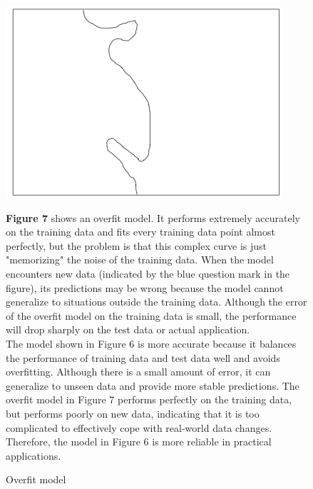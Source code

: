 \documentclass[12pt,a4paper]{article}
\begin{document}
\begin{figure}[h]
    \centering
    \includegraphics[width=0.5\linewidth]{Overfit model.png}
    \caption{  Overfit model}
    \label{fig:enter-label}
    \vspace{1em}
    \textbf{Figure 7} shows an overfit model. It performs extremely accurately on the training data and fits every training data point almost perfectly, but the problem is that this complex curve is just "memorizing" the noise of the training data. When the model encounters new data (indicated by the blue question mark in the figure), its predictions may be wrong because the model cannot generalize to situations outside the training data. Although the error of the overfit model on the training data is small, the performance will drop sharply on the test data or actual application.\\
    \vspace{2em}
    \text The model shown in Figure 6 is more accurate because it balances the performance of training data and test data well and avoids overfitting. Although there is a small amount of error, it can generalize to unseen data and provide more stable predictions. The overfit model in Figure 7 performs perfectly on the training data, but performs poorly on new data, indicating that it is too complicated to effectively cope with real-world data changes. Therefore, the model in Figure 6 is more reliable in practical applications.

    
\end{figure}
\end{document}
